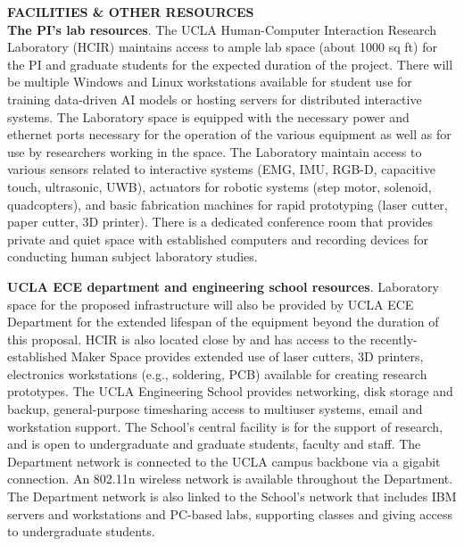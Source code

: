 {\noindent \bf \Large FACILITIES \& OTHER RESOURCES}\\

{\bf The PI's lab resources}. 
The UCLA Human-Computer Interaction Research Laboratory (HCIR) maintains access to ample lab space (about 1000 sq ft) for the PI and graduate students for the expected duration of the project. 
There will be multiple Windows and Linux workstations available for student use for training data-driven AI models or hosting servers for distributed interactive systems. 
The Laboratory space is equipped with the necessary power and ethernet ports necessary for the operation of the various equipment as well as for use by researchers working in the space.
The Laboratory maintain access to various sensors related to interactive systems (EMG, IMU, RGB-D, capacitive touch, ultrasonic, UWB), actuators for robotic systems (step motor, solenoid, quadcopters), and basic fabrication machines for rapid prototyping (laser cutter, paper cutter, 3D printer).
There is a dedicated conference room that provides private and quiet space with established computers and recording devices for conducting human subject laboratory studies.

{\bf UCLA ECE department and engineering school resources}.
Laboratory space for the proposed infrastructure will also be provided by UCLA ECE Department for the extended lifespan of the equipment beyond the duration of this proposal. 
HCIR is also located close by and has access to the recently-established Maker Space provides extended use of laser cutters, 3D printers, electronics workstations (e.g., soldering, PCB) available for creating research prototypes.
The UCLA Engineering School provides networking, disk storage and backup, general-purpose timesharing access to multiuser systems, email and workstation support. The School's central facility is for the support of research, and is open to undergraduate and graduate students, faculty and staff. The Department network is connected to the UCLA campus backbone via a gigabit connection. An 802.11n wireless network is available throughout the Department. The Department network is also linked to the School's network that includes IBM servers and workstations and PC-based labs, supporting classes and giving access to undergraduate students.

